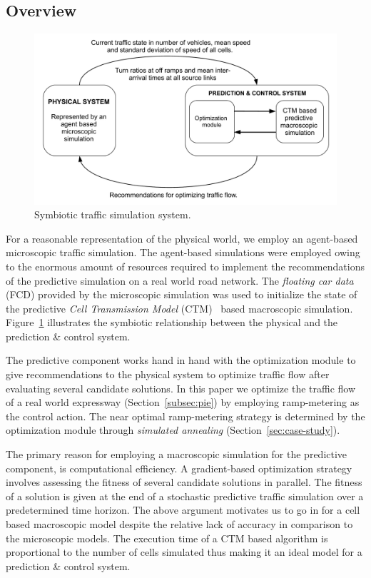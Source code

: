 \documentclass{wscpaperproc}
\theoremstyle{wsc}
\begin{document}
\subsection{Overview}
\label{sec:sts}
\begin{figure}[!htbp]
    \centering
    \includegraphics[scale=0.42]{images/methodology.pdf}

    \caption{Symbiotic traffic simulation system.}
    \label{fig:sts-platform}
  \end{figure}

For a reasonable representation of the physical world, we employ an agent-based microscopic traffic simulation. The agent-based simulations were employed owing to the enormous amount of resources required to implement the recommendations of the predictive simulation on a real world road network. The {\it floating car data} (FCD) provided by the microscopic simulation was used to initialize the state of the predictive {\it Cell Transmission Model} (CTM)~\cite{daganzo1994cell} based macroscopic simulation.  Figure~\ref{fig:sts-platform} illustrates the symbiotic relationship between the physical and the prediction \& control system. 

The predictive component works hand in hand with the optimization module to give  recommendations to the physical system to optimize traffic flow after evaluating several candidate solutions. In this paper we optimize the traffic flow of a real world expressway (Section~\ref{subsec:pie}) by employing ramp-metering as the control action. The near optimal ramp-metering strategy is determined by the optimization module through {\it simulated annealing} (Section~\ref{sec:case-study}).

The primary reason for employing a macroscopic simulation for the predictive component, is computational efficiency. A gradient-based optimization strategy involves assessing the fitness of several candidate solutions in parallel. The fitness of a solution is given at the end of a stochastic predictive traffic simulation over a predetermined time horizon.  The above argument motivates us to go in for a cell based macroscopic model despite the relative lack of accuracy in comparison to the microscopic models. The execution time of a CTM based algorithm is proportional to the number of cells simulated thus making it an ideal model for a prediction \& control system.
\end{document}
